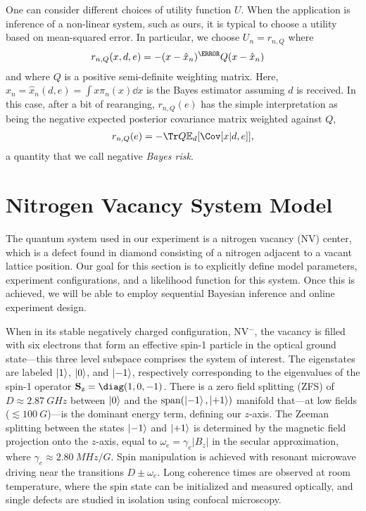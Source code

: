 \documentclass[aps,nofootinbib,twocolumn,superscriptaddress]{revtex4}
\newcommand{\mps}{x}
\newcommand{\eps}{e}
\newcommand{\data}{d}
\begin{document}
One can consider different choices of utility function $U$.
When the application is inference of a non-linear system, such as 
ours, it is typical to choose a utility based on 
mean-squared error.
In particular, we choose $U_n=r_{n,Q}$ where
\begin{align}
    r_{n,Q}(\mps,\data,\eps)
        &= -(\mps - \hat\mps_n)^\T Q (\mps - \hat\mps_n)
\end{align}
and where $Q$ is a positive semi-definite weighting matrix.
Here, $\hat{\mps}_n=\hat{\mps}_n(\data,\eps)=\int \mps \pi_n(\mps)\dd\mps$
is the Bayes estimator assuming $\data$ is received.
In this case, after a bit of rearanging, 
$r_{n,Q}(\eps)$ has the simple interpretation 
as being the negative expected posterior covariance matrix weighted
against $Q$,
\begin{align}
    r_{n,Q}(\eps) = -\Tr Q\expect_\data[\Cov[\mps|\data,\eps]],
    \label{eq:bayes-risk}
\end{align}
a quantity that we call negative \textit{Bayes risk}.

\section{Nitrogen Vacancy System Model}
\label{sec:system-model}

The quantum system used in our experiment is a nitrogen vacancy (NV) center,
which is a defect found in diamond consisting of a nitrogen adjacent to 
a vacant lattice position.
Our goal for this section is to explicitly define model parameters, experiment configurations, and a likelihood function for this system.
Once this is achieved, we will be able to employ sequential 
Bayesian inference and online experiment design.

When in its stable negatively charged configuration, NV$^-$, 
the vacancy is filled with
six electrons that form an effective spin-1 particle in the optical
ground state---this three level subspace comprises the system of interest.
The eigenstates are labeled $\ket{1}$, $\ket{0}$, and $\ket{-1}$, respectively 
corresponding to the eigenvalues of the spin-1 operator $\Sz=\diag(1,0,-1)$.
There is a zero field splitting (ZFS) of $D\approx\SI{2.87}{GHz}$ 
between $\ket{0}$ and the $\operatorname{span}(\ket{-1},\ket{+1})$ manifold 
that---at low fields ($\lesssim\SI{100}{G}$)---is the dominant energy term,
defining our $z$-axis.
The Zeeman splitting between the states $\ket{-1}$ and $\ket{+1}$ 
is determined by the magnetic field projection onto the $z$-axis, equal to
$\omega_e=\gamma_e |B_z|$ in the secular approximation, 
where $\gamma_e\approx\SI{2.80}{MHz/G}$.
Spin manipulation is achieved with resonant microwave driving near
the transitions $D\pm\omega_e$.
Long coherence times are observed at room temperature, where
the spin state can be initialized and measured optically, and single 
defects are studied in isolation using confocal microscopy.
\end{document}
